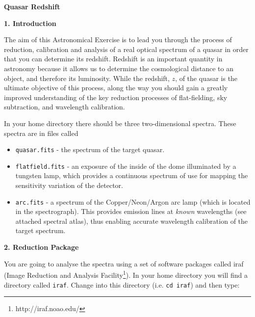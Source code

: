 \pagestyle{myheadings}
\setcounter{page}{1}

\begin{center}
{\Huge\bf Quasar Redshift}
\end{center}

\vspace{0.3cm}

{\large {\bf 1. Introduction}}

The aim of this Astronomical Exercise is to lead you through the process of reduction, calibration and analysis of a real optical spectrum of a quasar in order that you can determine its redshift. Redshift is an important quantity in astronomy because it allows us to determine the cosmological distance to an object, and therefore its luminosity. While the redshift, $z$, of the quasar is the ultimate objective of this process, along the way you should gain a greatly improved understanding of the key reduction processes of flat-fielding, sky subtraction, and wavelength calibration.

In your home directory there should be three two-dimensional spectra. These spectra are in files called
\begin{itemize}

\item{{\tt quasar.fits} - the spectrum of the target quasar.}

\item{{\tt flatfield.fits} - an exposure of the inside of the dome illuminated by a tungsten lamp, which provides a continuous spectrum of use for mapping the sensitivity variation of the detector.} %

\item{{\tt arc.fits} - a spectrum of the Copper/Neon/Argon arc lamp (which is located in the spectrograph). This provides emission lines at {\em known} wavelengths (see attached spectral atlas), thus enabling accurate wavelength calibration of the target spectrum.}

\end{itemize}

{\large {\bf 2. Reduction Package}}

You are going to analyse the spectra using a set of software packages called {\sc iraf} (Image Reduction and Analysis Facility\footnote{http://iraf.noao.edu/}). In your home directory you will find a directory called {\tt iraf}. Change into this directory (i.e. {\tt cd iraf}) and then type:

